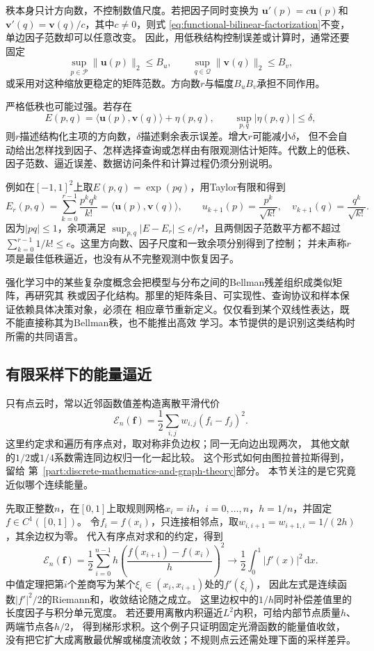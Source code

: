 秩本身只计方向数，不控制数值尺度。若把因子同时变换为
$\bm{u}'(p)=c\bm{u}(p)$和
$\bm{v}'(q)=\bm{v}(q)/c$，其中$c\neq0$，则式
\eqref{eq:functional-bilinear-factorization}不变，单边因子范数却可以任意改变。
因此，用低秩结构控制误差或计算时，通常还要固定
\[
  \sup_{p\in\mathcal{P}}\lVert\bm{u}(p)\rVert_2\leq B_u,
  \qquad
  \sup_{q\in\mathcal{Q}}\lVert\bm{v}(q)\rVert_2\leq B_v,
\]
或采用对这种缩放更稳定的矩阵范数。方向数$r$与幅度$B_uB_v$承担不同作用。

严格低秩也可能过强。若存在
\[
  E(p,q)
  =
  \langle\bm{u}(p),\bm{v}(q)\rangle+\eta(p,q),
  \qquad
  \sup_{p,q}|\eta(p,q)|\leq\delta,
\]
则$r$描述结构化主项的方向数，$\delta$描述剩余表示误差。增大$r$可能减小$\delta$，
但不会自动给出怎样找到因子、怎样选择查询或怎样由有限观测估计矩阵。代数上的低秩、
因子范数、逼近误差、数据访问条件和计算过程仍须分别说明。

例如在$[-1,1]^2$上取$E(p,q)=\exp(pq)$，用Taylor有限和得到
\[
 E_r(p,q)=\sum_{k=0}^{r-1}\frac{p^kq^k}{k!}
 =\langle\bm u(p),\bm v(q)\rangle,\qquad
 u_{k+1}(p)=\frac{p^k}{\sqrt{k!}},\quad
 v_{k+1}(q)=\frac{q^k}{\sqrt{k!}}.
\]
因为$|pq|\leq1$，余项满足
$\sup_{p,q}|E-E_r|\leq e/r!$，且两侧因子范数平方都不超过
$\sum_{k=0}^{r-1}1/k!\leq e$。这里方向数、因子尺度和一致余项分别得到了控制；
并未声称$r$项是最佳低秩逼近，也没有从不完整观测中恢复因子。

强化学习中的某些复杂度概念会把模型与分布之间的Bellman残差组织成类似矩阵，再研究其
秩或因子化结构。那里的矩阵条目、可实现性、查询协议和样本保证依赖具体决策对象，必须在
相应章节重新定义。仅仅看到某个双线性表达，既不能直接称其为Bellman秩，也不能推出高效
学习。本节提供的是识别这类结构时所需的共同语言。

\subsection{有限采样下的能量逼近}
\label{sec:functional-sampled-energy-approximation}
\label{sec:geometry-sampled-geometric-operators}

只有点云时，常以近邻函数值差构造离散平滑代价
\[
 \mathcal E_n(\bm f)=\frac12\sum_{i,j}w_{i,j}(f_i-f_j)^2.
\]
这里约定求和遍历有序点对，取对称非负边权；同一无向边出现两次，
其他文献的$1/2$或$1/4$系数需连同边权归一化一起比较。
这个形式如何由图拉普拉斯得到，留给
第~\ref{part:discrete-mathematics-and-graph-theory}部分。
本节关注的是它究竟近似哪个连续能量。

先取正整数$n$，在$[0,1]$上取规则网格$x_i=ih$，$i=0,\ldots,n$，$h=1/n$，并固定$f\in C^1([0,1])$。
令$f_i=f(x_i)$，只连接相邻点，取$w_{i,i+1}=w_{i+1,i}=1/(2h)$，其余边权为零。
代入有序点对求和的约定，得到
\[
 \mathcal E_n(\bm f)=\frac12\sum_{i=0}^{n-1}h
 \left(\frac{f(x_{i+1})-f(x_i)}h\right)^2
 \longrightarrow\frac12\int_0^1|f'(x)|^2\,\mathrm dx.
\]
中值定理把第$i$个差商写为某个$\xi_i\in(x_i,x_{i+1})$处的$f'(\xi_i)$，
因此左式是连续函数$|f'|^2/2$的Riemann和，收敛结论随之成立。
这里边权中的$1/h$同时补偿差值里的长度因子与积分单元宽度。
若还要用离散内积逼近$L^2$内积，可给内部节点质量$h$、两端节点各$h/2$，
得到梯形求积。这个例子只证明固定光滑函数的能量值收敛，
没有把它扩大成离散最优解或梯度流收敛；不规则点云还需处理下面的采样差异。

